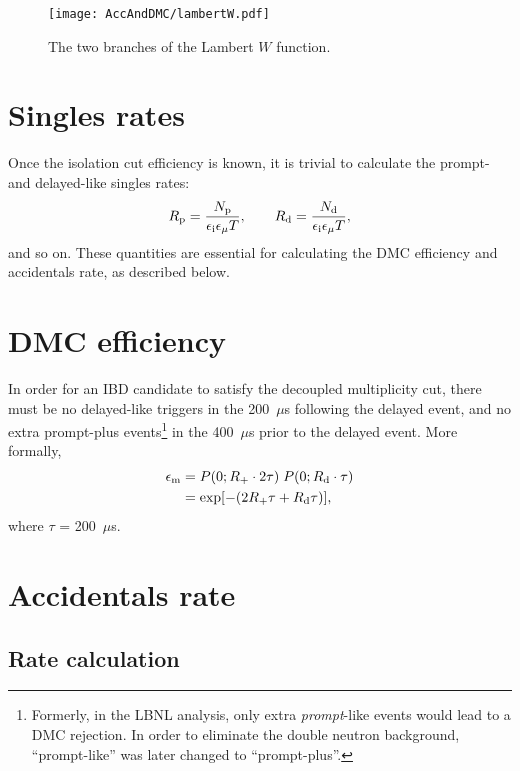 \documentclass[../thesis.tex]{subfiles}
\begin{document}
\begin{figure}
  \centering \texttt{[image: AccAndDMC/lambertW.pdf]}
  \caption{The two branches of the Lambert $W$ function.}
  \label{fig:lambertW}
\end{figure}

\section{Singles rates}
\label{sec:singratescalc}

Once the isolation cut efficiency is known, it is trivial to calculate the
prompt- and delayed-like singles rates:
\begin{equation}
  \label{eq:accSingRates}
  R_\mathrm{p} = \frac{N_\mathrm{p}}{\epsilon_\mathrm{i} \epsilon_\mathrm{\mu} T},\qquad
  R_\mathrm{d} = \frac{N_\mathrm{d}}{\epsilon_\mathrm{i} \epsilon_\mathrm{\mu} T},
\end{equation}
and so on. These quantities are essential for calculating the DMC efficiency and accidentals rate, as described below.

\section{DMC efficiency}
\label{sec:dmceffcalc}

\def\edmc{\ensuremath{\epsilon_\mathrm{m}}}

In order for an IBD candidate to satisfy the decoupled multiplicity cut, there
must be no delayed-like triggers in the 200~$\mu$s following the delayed event,
and no extra prompt-plus events\footnote{Formerly, in the LBNL analysis, only
  extra \emph{prompt}-like events would lead to a DMC rejection. In order to
  eliminate the double neutron background, ``prompt-like'' was later changed to
  ``prompt-plus''.} in the 400~$\mu$s prior to the delayed event. More formally,
\begin{align}
  \edmc &= P(0; \Rplu \cdot 2\tau)\;P(0; \Rdel \cdot \tau) \nonumber \\
        &= \exp [-(2\Rplu\tau + \Rdel\tau)],
          \label{eq:dmcEff}
\end{align}
where $\tau$ = 200~$\mu$s.

\section{Accidentals rate}
\label{sec:accratecalc}

\subsection{Rate calculation}
\label{sec:accRateCalc}
\end{document}

